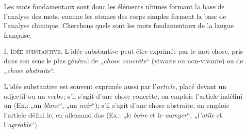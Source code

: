 {    Les mots fondamentaux sont donc les éléments ultimes formant la
    base de l’analyse des mots, comme les atomes des corps simples
    forment la base de l’analyse chimique. Cherchons quels sont les
    mots fondamentaux de la langue française.

    I.\textsc{ Idée substantive}. L’idée substantive peut être
    exprimée par le mot \textup{chose}, pris dans son sens le plus
    général de „\emph{chose concrète}“ (vivante ou non-vivante) ou de
    „\emph{chose abstraite}“.

    L’idée substantive est souvent exprimée aussi par
    l'\emph{article}, placé devant un adjectif ou un verbe; s’il
    s’agit d’une chose concrète, on emploie l’article indéfini
    \textup{un} (Ex.: „\textup{un} \emph{blanc}“, „\textup{un}
    \emph{noir}“); s’il s’agit d’une chose abstraite, on emploie
    l’article défini \textup{le}, en allemand \textup{das} (Ex.: „\textup{le}
    \emph{boire} et \textup{le} \emph{manger}“,
    „\textup{l}\emph{'utile} et \textup{l}\emph{'agréable}“).

  }
  
